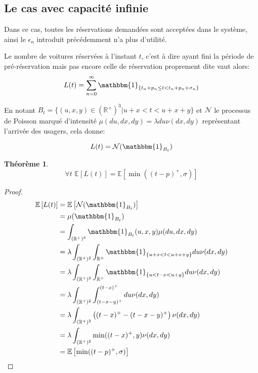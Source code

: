 \documentclass[12pt,a4paper]{article}
\newcommand{\E}[1]{\mathbb{E}\left[ #1 \right]}
\newcommand{\R}{\mathbb{R}}
\newcommand{\1}[1]{\mathbbm{1}_{\{#1\}} }
\newtheorem{theorem}{Théorème}
\theoremstyle{definition}
\begin{document}
{\subsection{Le cas avec capacité infinie}

Dans ce cas, toutes les réservations demandées sont acceptées dans le système, ainsi le $\epsilon_n$ introduit précédemment n'a plus d'utilité.



Le nombre de voitures réservées à l'instant $t$, c'est à dire ayant fini la période de pré-réservation mais pas encore celle de réservation proprement dite vaut alors:
\begin{equation}
L(t) = \sum_{n=0}^{\infty} 	\mathbbm{1}_{\{t_n+p_n \leq t < t_n + p_n +\sigma_n\}}
\end{equation}

En notant $B_t = \{(u,x,y) \in \left(\mathbb{R}^+\right)^3  | u+x<t<u+x+y \} $ et $\mathcal{N}$ le processus de Poisson marqué d'intensité $\mu(du,dx,dy) = \lambda du \nu(dx,dy)$ représentant l'arrivée des usagers, cela donne:

\begin{equation}
L(t) = \mathcal{N}(\mathbbm{1}_{B_t})
\end{equation}



\begin{theorem} {}



\begin{equation}
\forall t\,\,\E{L(t)} = \E{\min((t-p)^+,\sigma)}	
\end{equation}

\end{theorem}

\begin{proof}
\begin{align*}
\E{L(t)} &= \E{\mathcal{N}(\mathbbm{1}_{B_t})}\\
&= \mu(\mathbbm{1}_{B_t})\\
&= \int_{(\R^+)^3} \mathbbm{1}_{B_t}(u,x,y) \mu(du,dx,dy)\\
&= \lambda \int_{(\R^+)^2} \int_{\R^+} \1{ u+x<t<u+x+y} du \nu(dx,dy)\\
&= \lambda \int_{(\R^+)^2} \int_{\R^+} \1{ u<t-x<u+y} du \nu(dx,dy)\\
&= \lambda \int_{(\R^+)^2} \int_{(t-x-y)^+}^{(t-x)^+} du \nu(dx,dy)\\
&= \lambda \int_{(\R^+)^2} \left((t-x)^+-(t-x-y)^+\right)  \nu(dx,dy)\\
&= \lambda \int_{(\R^+)^2} \min((t-x)^+,y)  \nu(dx,dy)\\
&= \E{\min((t-p)^+,\sigma)}	
\end{align*}


\end{proof}}
\end{document}
